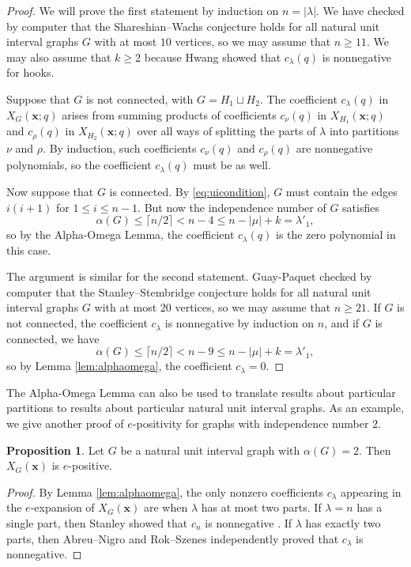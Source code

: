 \documentclass[12pt]{amsart}  %
\theoremstyle{definition}
\newtheorem{proposition}[theorem]{Proposition}
\theoremstyle{remark}
\numberwithin{equation}{section}
\newcommand{\la}{\lambda}
\begin{document}
\begin{proof}
We will prove the first statement by induction on $n=|\lambda|$. We have checked by computer that the Shareshian--Wachs conjecture holds for all natural unit interval graphs $G$ with at most $10$ vertices, so we may assume that $n\geq 11$. We may also assume that $k\geq 2$ because Hwang \cite[Theorem 5.13]{chromtwoparthook} showed that $c_\lambda(q)$ is nonnegative for hooks. 

Suppose that $G$ is not connected, with $G=H_1\sqcup H_2$. The coefficient $c_\lambda(q)$ in $X_G(\bm x;q)$ arises from summing products of coefficients $c_\nu(q)$ in $X_{H_1}(\bm x;q)$ and $c_\rho(q)$ in $X_{H_2}(\bm x;q)$ over all ways of splitting the parts of $\lambda$ into partitions $\nu$ and $\rho$. By induction, such coefficients $c_\nu(q)$ and $c_\rho(q)$ are nonnegative polynomials, so the coefficient $c_\lambda(q)$ must be as well.

Now suppose that $G$ is connected. By \eqref{eq:uicondition}, $G$ must contain the edges $i(i+1)$ for $1\leq i\leq n-1$. But now the independence number of $G$ satisfies
$$
\alpha(G)\leq\lceil n/2\rceil<n-4\leq n-|\mu|+k=\lambda'_1,
$$
so by the Alpha-Omega Lemma, the coefficient $c_\lambda(q)$ is the zero polynomial in this case.

The argument is similar for the second statement. Guay-Paquet \cite[Page 8]{stanstemreduction} checked by computer that the Stanley--Stembridge conjecture holds for all natural unit interval graphs $G$ with at most $20$ vertices, so we may assume that $n\geq 21$. If $G$ is not connected, the coefficient $c_\lambda$ is nonnegative by induction on $n$, and if $G$ is connected, we have
$$
\alpha(G)\leq\lceil n/2\rceil<n-9\leq n-|\mu|+k=\lambda'_1,
$$
so by Lemma \ref{lem:alphaomega}, the coefficient $c_\lambda=0$. 
\end{proof}

The Alpha-Omega Lemma can also be used to translate results about particular partitions to results about particular natural unit interval graphs. As an example, we give another proof of $e$-positivity for graphs with independence number $2$.

\begin{proposition}
Let $G$ be a natural unit interval graph with $\alpha(G)=2$. Then $X_G(\bm x)$ is $e$-positive.
\end{proposition}

\begin{proof}
By Lemma \ref{lem:alphaomega}, the only nonzero coefficients $c_\lambda$ appearing in the $e$-expansion of $X_G(\bm x)$ are when $\la$ has at most two parts. If $\lambda=n$ has a single part, then Stanley showed that $c_n$ is nonnegative \cite[Theorem 3.3]{chromsym}.  If $\lambda$ has exactly two parts, then Abreu--Nigro \cite[Corollary 1.10]{chromhesssplitting} and Rok--Szenes \cite[Theorem 4.1]{chromeschers} independently proved that $c_\lambda$ is nonnegative. 
\end{proof}
\end{document}

